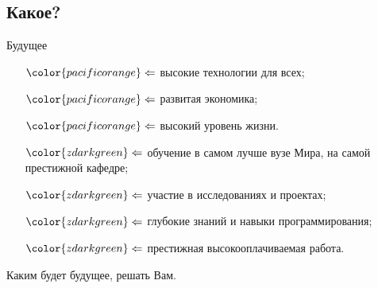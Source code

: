 \subsection{Какое?}

\begin{frame}{Будущее}
    {\footnotesize
        \begin{itemize}
            \item[${\color{pacificorange} \Leftarrow}$]
                высокие технологии для всех;
            \item[${\color{pacificorange} \Leftarrow}$]
                развитая экономика;
            \item[${\color{pacificorange} \Leftarrow}$]
                высокий уровень жизни.
        \end{itemize}
    }
    \vspace{12pt}
    {\footnotesize
        \begin{itemize}
            \item[${\color{zdarkgreen} \Leftarrow}$]
                обучение в самом лучше вузе Мира,
                на самой престижной кафедре;
            \item[${\color{zdarkgreen} \Leftarrow}$]
                участие в исследованиях и проектах;
            \item[${\color{zdarkgreen} \Leftarrow}$]
                глубокие знаний и навыки программирования;
            \item[${\color{zdarkgreen} \Leftarrow}$]
                престижная высокооплачиваемая работа.
        \end{itemize}
    }
    \vspace{12pt}
    Каким будет будущее, решать Вам.
\end{frame}
